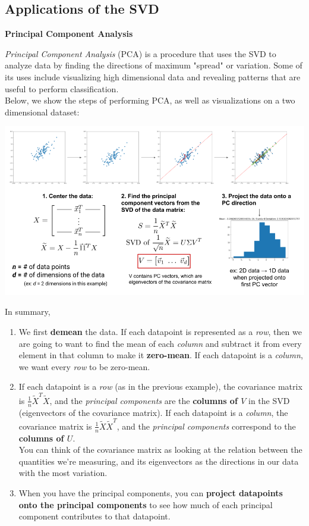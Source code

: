 \renewcommand{\arraystretch}{1.25}

\subsection*{Applications of the SVD}
\textbf{Principal Component Analysis}

\textit{Principal Component Analysis} (PCA) is a procedure that uses the SVD to analyze data by finding the directions of maximum "spread" or variation. Some of its uses include visualizing high dimensional data and revealing patterns that are useful to perform classification.\\
\newline
Below, we show the steps of performing PCA, as well as visualizations on a two dimensional dataset:

\includegraphics[width=\textwidth]{figures/pca-steps}

In summary,
\begin{enumerate}
    \item We first \textbf{demean} the data. If each datapoint is represented as a \textit{row}, then we are going to want to find the mean of each \textit{column} and subtract it from every element in that column to make it \textbf{zero-mean}. If each datapoint is a \textit{column}, we want every \textit{row} to be zero-mean.
    \item If each datapoint is a \textit{row} (as in the previous example), the covariance matrix is $\frac{1}{n} \widetilde{X}^T\widetilde{X}$, and the \textit{principal components} are the \textbf{columns of $V$} in the SVD (eigenvectors of the covariance matrix). 
    If each datapoint is a \textit{column}, the covariance matrix is $\frac{1}{n} \widetilde{X}\widetilde{X}^T$, and the \textit{principal components} correspond to the \textbf{columns of $U$}. \\
    \newline
    You can think of the covariance matrix as looking at the relation between the quantities we're measuring, and its eigenvectors as the directions in our data with the most variation.
    \item When you have the principal components, you can \textbf{project datapoints onto the principal components} to see how much of each principal component contributes to that datapoint.
\end{enumerate}

